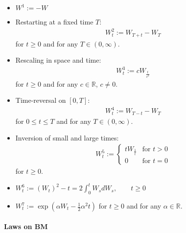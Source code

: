 \documentclass[a4paper,landscape,8pt,fleqn]{scrartcl}
\begin{document}
\begin{multicols*}{3}
\begin{itemize}
\item $W^1 := - W$
\item Restarting at a fixed time $T$:
\begin{align*}
W_t^2 := W_{T+t} -W_T
\end{align*}
for $t \geq 0$ and for any $T \in (0, \infty)$.
\item Rescaling in space and time:
\begin{align*}
W_t^3 := c W_{\frac{t}{c^2}}
\end{align*}
for $t \geq 0$ and for any $c \in \mathbb{R}$, $c \neq 0$.
\item Time-reversal on $[0,T]$:
\begin{align*}
W_t^4 := W_{T-t} - W_T
\end{align*}
for $0 \leq t \leq T$ and for any $T \in (0, \infty)$.
\item Inversion of small and large times:
\begin{align*}
W_t^5 :=
\begin{cases}
t W_{\frac{1}{t}} & \text{for } t > 0 \\
0 & \text{for } t = 0
\end{cases}
\end{align*}
for $t \geq 0$.
\item $W_t^6 := (W_t)^2 - t = 2 \int_0^t W_s dW_s, \qquad t \geq 0$
\item $W_t^7 := \exp \left( \alpha W_t - \frac{1}{2} \alpha^2 t \right)$ for $t \geq 0$ and for any $\alpha \in \mathbb{R}$.
\end{itemize}

\paragraph{Laws on BM}


\end{multicols*}
\end{document}
